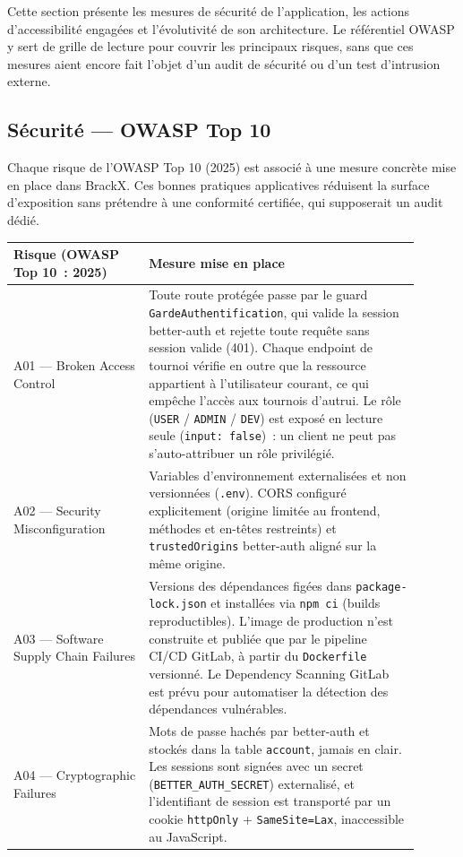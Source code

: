 Cette section présente les mesures de sécurité de l'application, les actions d'accessibilité engagées et l'évolutivité de son architecture. Le référentiel OWASP y sert de grille de lecture pour couvrir les principaux risques, sans que ces mesures aient encore fait l'objet d'un audit de sécurité ou d'un test d'intrusion externe.

\subsection{Sécurité — OWASP Top 10}
Chaque risque de l'OWASP Top 10 (2025) est associé à une mesure concrète mise en place dans BrackX. Ces bonnes pratiques applicatives réduisent la surface d'exposition sans prétendre à une conformité certifiée, qui supposerait un audit dédié.

\begin{longtable}{|>{\raggedright\arraybackslash}p{0.30\linewidth}|>{\raggedright\arraybackslash}p{0.60\linewidth}|}
    \hline
    \textbf{Risque (OWASP Top 10~: 2025)} & \textbf{Mesure mise en place} \\
    \hline
    \endhead
    A01 --- Broken Access Control & Toute route protégée passe par le guard \texttt{GardeAuthentification}, qui valide la session better-auth et rejette toute requête sans session valide (401). Chaque endpoint de tournoi vérifie en outre que la ressource appartient à l'utilisateur courant, ce qui empêche l'accès aux tournois d'autrui. Le rôle (\texttt{USER} / \texttt{ADMIN} / \texttt{DEV}) est exposé en lecture seule (\texttt{input: false})~: un client ne peut pas s'auto-attribuer un rôle privilégié. \\
    \hline
    A02 --- Security Misconfiguration & Variables d'environnement externalisées et non versionnées (\texttt{.env}). CORS configuré explicitement (origine limitée au frontend, méthodes et en-têtes restreints) et \texttt{trustedOrigins} better-auth aligné sur la même origine. \\
    \hline
    A03 --- Software Supply Chain Failures & Versions des dépendances figées dans \texttt{package-lock.json} et installées via \texttt{npm ci} (builds reproductibles). L'image de production n'est construite et publiée que par le pipeline CI/CD GitLab, à partir du \texttt{Dockerfile} versionné. Le Dependency Scanning GitLab est prévu pour automatiser la détection des dépendances vulnérables. \\
    \hline
    A04 --- Cryptographic Failures & Mots de passe hachés par better-auth et stockés dans la table \texttt{account}, jamais en clair. Les sessions sont signées avec un secret (\texttt{BETTER\_AUTH\_SECRET}) externalisé, et l'identifiant de session est transporté par un cookie \texttt{httpOnly} + \texttt{SameSite=Lax}, inaccessible au JavaScript. \\

\end{longtable}
